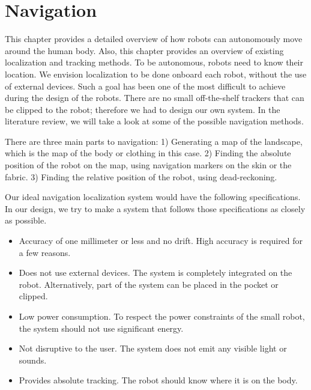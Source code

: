 

\chapter{Navigation}
This chapter provides a detailed overview of how robots can autonomously move around the human body. Also, this chapter provides an overview of existing localization and tracking methods. To be autonomous, robots need to know their location. We envision localization to be done onboard each robot, without the use of external devices. Such a goal has been one of the most difficult to achieve during the design of the robots. There are no small off-the-shelf trackers that can be clipped to the robot; therefore we had to design our own system.  In the literature review, we will take a look at some of the possible navigation methods. %

There are three main parts to navigation: 
1) Generating a map of the landscape, which is the map of the body or clothing in this case. 2) Finding the absolute position of the robot on the map, using navigation markers on the skin or the fabric. 3) Finding the relative position of the robot, using dead-reckoning. 

Our ideal navigation localization system would have the following specifications. In our design, we try to make a system that follows those specifications as closely as possible. 
\begin{itemize}
    \item Accuracy of one millimeter or less and no drift. High accuracy is required for a few reasons. %
    
    \item Does not use external devices. The system is completely integrated on the robot. Alternatively, part of the system can be placed in the pocket or clipped. 
    
    \item Low power consumption.  To respect the power constraints of the small robot, the system should not use significant energy.
    \item Not disruptive to the user. The system does not emit any visible light or sounds. 
    \item Provides absolute tracking. The robot should know where it is on the body. 
\end{itemize}


